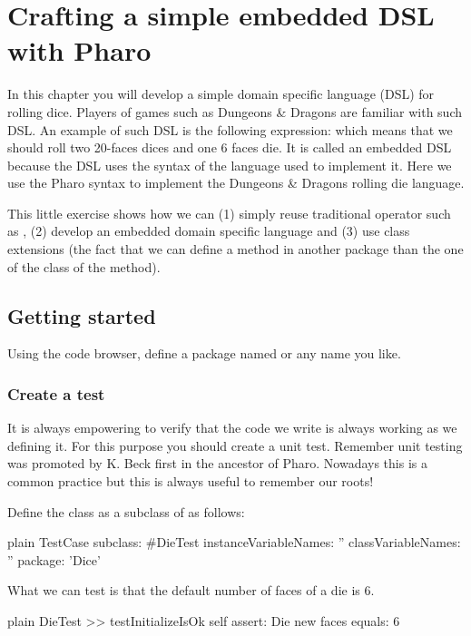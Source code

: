 \documentclass[10pt,twoside,english]{_support/latex/sbabook/sbabook}
\begin{document}
\frontmatter
\pagestyle{plain}

\tableofcontents*
\clearpage\listoffigures

\mainmatter

\chapter{Crafting a simple embedded DSL with Pharo}\label{cha:dsl}
In this chapter you will develop a simple domain specific language (DSL) for rolling dice. Players of games such as Dungeons \& Dragons are familiar with such DSL. An example of such DSL is the following expression:  which means that we should roll two 20-faces dices and one 6 faces die. 
It is called an embedded DSL because the DSL uses the syntax of the language used to implement it. Here we use the Pharo syntax to implement the Dungeons \& Dragons rolling die language. 

This little exercise shows how we can (1) simply reuse traditional operator such as \textcode{+}, (2) develop an embedded domain specific language and (3) use class extensions (the fact that we can define a method in another package than the one of the class of the method).
\section{Getting started}
Using the code browser, define a package named  or any name you like.
\subsection{Create a test }
It is always empowering to verify that the code we write is always working as we defining it. For this purpose you should create a unit test. Remember unit testing was promoted by K. Beck first in the ancestor of Pharo. Nowadays this is a common practice but this is always useful to remember our roots!

Define the class  as a subclass of  as follows: 

\begin{displaycode}{plain}
TestCase subclass: #DieTest
	instanceVariableNames: ''
	classVariableNames: ''
	package: 'Dice'
\end{displaycode}

What we can test is that the default number of faces of a die is 6. 

\begin{displaycode}{plain}
DieTest >> testInitializeIsOk
    self assert: Die new faces equals: 6
\end{displaycode}
\end{document}
